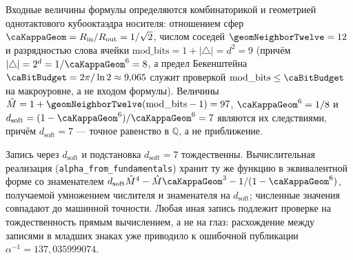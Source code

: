 \begin{remark}
\label{rem:alpha-canonical-form}
Входные величины формулы определяются комбинаторикой и геометрией однотактового кубооктаэдра носителя: отношением сфер $\caKappaGeom = R_{\mathrm{in}}/R_{\mathrm{out}} = 1/\sqrt{2}$, числом соседей $\geomNeighborTwelve = 12$ и разрядностью слова ячейки $\mathrm{mod\_bits} = 1 + |\triangle| = d^2 = 9$ (причём $|\triangle| = 2^d = 1/\caKappaGeom^6 = 8$, а предел Бекенштейна $\caBitBudget = 2\pi/\ln 2 \approx 9{,}065$ служит проверкой $\mathrm{mod\_bits} \le \caBitBudget$ на макроуровне, а не входом формулы). Величины $\hat M = 1 + \geomNeighborTwelve(\mathrm{mod\_bits} - 1) = 97$, $\caKappaGeom^6 = 1/8$ и $d_{\mathrm{soft}} = (1-\caKappaGeom^6)/\caKappaGeom^6 = 7$ являются их следствиями, причём $d_{\mathrm{soft}} = 7$ — точное равенство в $\mathbb{Q}$, а не приближение.

Запись через $d_{\mathrm{soft}}$ и подстановка $d_{\mathrm{soft}} = 7$ тождественны. Вычислительная реализация (\texttt{alpha\_from\_fundamentals}) хранит ту же функцию в эквивалентной форме со знаменателем $d_{\mathrm{soft}}\hat M^{4} - \hat M\caKappaGeom^{3} - 1/(1-\caKappaGeom^{6})$, получаемой умножением числителя и знаменателя на $d_{\mathrm{soft}}$; численные значения совпадают до машинной точности. Любая иная запись подлежит проверке на тождественность прямым вычислением, а не на глаз: расхождение между записями в младших знаках уже приводило к ошибочной публикации $\alpha^{-1} = 137{,}035999074$.
\end{remark}

